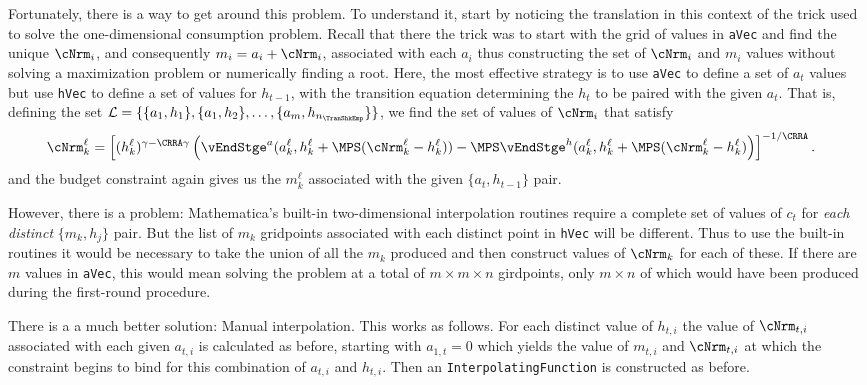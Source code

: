 \documentclass[\econtexRoot/SolvingMicroDSOPs]{subfiles}
\begin{document}
Fortunately, there is a way to get around this problem.  To
understand it, start by noticing the translation in this context of
the trick used to solve the one-dimensional consumption problem.
Recall that there the trick was to start with the grid of values in
\texttt{aVec} and find the unique ${\cNrm}_{i}$, and
consequently ${m}_{i}={a}_{i}+{\cNrm}_{i}$, associated with
each ${a}_{i}$ thus constructing the set of ${\cNrm}_{i}$ and
${m}_{i}$ values without solving a maximization problem or
numerically finding a root.  Here, the most effective strategy is to
use \texttt{aVec} to define a set of ${a}_{t}$ values but use
\texttt{hVec} to define a set of values for $h_{t-1}$, with the
transition equation determining the $h_{t}$ to be paired with the
given ${a}_{t}$.  That is, defining the set $\mathcal{L} =
\{\{{a}_{1},h_{1}\},\{{a}_{1},h_{2}\},\ldots,\{{a}_{m},h_{n_{\TranShkEmp}}\}\}$,
we find the set of values of ${\cNrm}_{i}$ that satisfy
\begin{equation}\begin{gathered}\begin{aligned}
  {\cNrm}_{k}^{\ell}  & = \left[(h_{k}^{\ell})^{\gamma-\CRRA\gamma}
                        \left(\vEndStge^{{a}}({a}_{k}^{\ell},h_{k}^{\ell}
                        +\MPS({\cNrm}_{k}^{\ell}-h_{k}^{\ell}))
                        -\MPS
                        \vEndStge^{h}({a}_{k}^{\ell},h_{k}^{\ell}+\MPS({\cNrm}_{k}^{\ell}-h_{k}^{\ell})\right)
                        \right]^{-1/\CRRA}. \nonumber
\end{aligned}\end{gathered}\end{equation}
and the budget constraint again gives us the ${m}_{k}^{\ell}$
associated with the given $\{{a}_{t},h_{t-1}\}$ pair.

However, there is a problem: {Mathematica}'s built-in two-dimensional
interpolation routines require a complete set of values of ${c}_{t}$
for \textit{each distinct} $\{{m}_{k},h_{j}\}$ pair.  But the list of
${m}_{k}$ gridpoints associated with each distinct point in
\texttt{hVec} will be different.  Thus to use the built-in routines
it would be necessary to take the union of all the ${m}_{k}$
produced and then construct values of ${\cNrm}_{k}$ for each of
these.  If there are $m$ values in \texttt{aVec}, this would
mean solving the problem at a total of $m \times m \times n$
girdpoints, only $m \times n$ of which would have been produced
during the first-round procedure.

There is a a much better solution: Manual interpolation.  This works
as follows.  For each distinct value of $h_{t,i}$ the value of
${\cNrm}_{t,i}$ associated with each given ${a}_{t,i}$ is
calculated as before, starting with ${a}_{1,t}=0$ which yields
the value of ${m}_{t,i}$ and ${\cNrm}_{t,i}$ at which the
constraint begins to bind for this combination of ${a}_{t,i}$
and $h_{t,i}$.  Then an \texttt{InterpolatingFunction} is
constructed as before.
\end{document}
